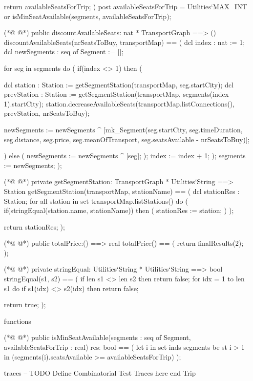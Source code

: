 \begin{vdmpp}[breaklines=true]
  return availableSeatsForTrip;
 )
 post availableSeatsForTrip = Utilities`MAX_INT or isMinSeatAvailable(segments, availableSeatsForTrip);
 
(*@
\label{discountAvailableSeats:74}
@*)
 public discountAvailableSeats: nat * TransportGraph ==> ()
 discountAvailableSeats(nrSeatsToBuy, transportMap) ==
 (
  dcl index : nat := 1;
  dcl newSegments : seq of Segment := [];
   
  for seg in segments do (
   if(index <> 1) then (
   
    dcl station : Station := getSegmentStation(transportMap, seg.startCity);
    dcl prevStation : Station := getSegmentStation(transportMap, segments(index - 1).startCity);
    station.decreaseAvailableSeats(transportMap.listConnections(), prevStation, nrSeatsToBuy);
     
    newSegments := newSegments ^
    [mk_Segment(seg.startCity, seg.timeDuration, seg.distance, seg.price, seg.meanOfTransport, seg.seatsAvailable - nrSeatsToBuy)];
   
   ) else (
    newSegments := newSegments ^ [seg];
   );
   index := index + 1;
  );
  segments := newSegments;
 );
 
(*@
\label{getSegmentStation:98}
@*)
 private getSegmentStation: TransportGraph * Utilities`String ==> Station 
 getSegmentStation(transportMap, stationName) ==
 (
  dcl stationRes : Station;
  for all station in set transportMap.listStations() do (
   if(stringEqual(station.name, stationName)) then (
    stationRes := station;
   )
  );
  
  return stationRes;
 );
 
(*@
\label{totalPrice:111}
@*)
 public totalPrice:() ==> real
 totalPrice() ==
 (
  return finalResults(2);
 );
 
(*@
\label{stringEqual:117}
@*)
 private stringEqual: Utilities`String * Utilities`String ==> bool
 stringEqual(s1, s2) ==
 (
  if len s1 <> len s2 then
   return false;
  for idx = 1 to len s1 do
   if s1(idx) <> s2(idx) then return false;
  
  return true;
 );

functions
 
(*@
\label{isMinSeatAvailable:130}
@*)
 public isMinSeatAvailable(segments : seq of Segment, availableSeatsForTrip : real) res: bool ==
 (
  let i in set inds segments be st i > 1 in (segments(i).seatsAvailable >=  availableSeatsForTrip)
 ); 

 
traces
-- TODO Define Combinatorial Test Traces here
end Trip
\end{vdmpp}
